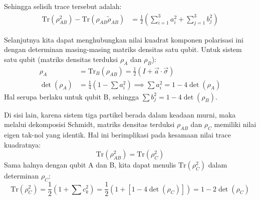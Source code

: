 Sehingga selisih trace tersebut adalah:
\begin{align*}
	\text{Tr}(\rho_{AB}^2) - \text{Tr}(\rho_{AB} \tilde{\rho}_{AB}) &= \frac{1}{2} \left( \sum_{i=1}^3 a_i^2 + \sum_{j=1}^3 b_j^2 \right)
\end{align*}

Selanjutnya kita dapat menghubungkan nilai kuadrat komponen polarisasi ini dengan determinan masing-masing matriks densitas satu qubit. Untuk sistem satu qubit (matriks densitas terduksi $\rho_A$ dan $\rho_B$):
\begin{align*}
	\rho_A &= \text{Tr}_B(\rho_{AB}) = \frac{1}{2} (I + \vec{a} \cdot \vec{\sigma}) \\
	\det(\rho_A) &= \frac{1}{4}(1 - \sum a_i^2) \implies \sum a_i^2 = 1 - 4\det(\rho_A)
\end{align*}
Hal serupa berlaku untuk qubit B, sehingga $\sum b_j^2 = 1 - 4\det(\rho_B)$.

Di sisi lain, karena sistem tiga partikel berada dalam keadaan murni, maka melalui dekomposisi Schmidt, matriks densitas terduksi $\rho_{AB}$ dan $\rho_C$ memiliki nilai eigen tak-nol yang identik. Hal ini berimplikasi pada kesamaan nilai trace kuadratnya:
\begin{equation*}
	\text{Tr}(\rho_{AB}^2) = \text{Tr}(\rho_C^2)
\end{equation*}
Sama halnya dengan qubit A dan B, kita dapat menulis $\text{Tr}(\rho_C^2)$ dalam determinan $\rho_C$:
\begin{equation*}
	\text{Tr}(\rho_C^2) = \frac{1}{2}(1 + \sum c_k^2) = \frac{1}{2}(1 + [1 - 4\det(\rho_C)]) = 1 - 2\det(\rho_C)
\end{equation*}

